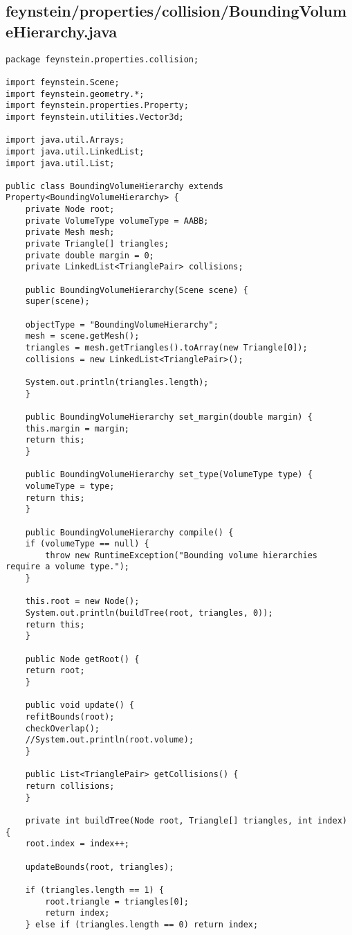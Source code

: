 \subsection*{feynstein/properties/collision/BoundingVolumeHierarchy.java}
\begin{lstlisting}
package feynstein.properties.collision;

import feynstein.Scene;
import feynstein.geometry.*;
import feynstein.properties.Property;
import feynstein.utilities.Vector3d;

import java.util.Arrays;
import java.util.LinkedList;
import java.util.List;

public class BoundingVolumeHierarchy extends Property<BoundingVolumeHierarchy> {
    private Node root;
    private VolumeType volumeType = AABB;
    private Mesh mesh;
    private Triangle[] triangles;
    private double margin = 0;
    private LinkedList<TrianglePair> collisions;

    public BoundingVolumeHierarchy(Scene scene) {
	super(scene);

	objectType = "BoundingVolumeHierarchy";
	mesh = scene.getMesh();
	triangles = mesh.getTriangles().toArray(new Triangle[0]);
	collisions = new LinkedList<TrianglePair>();

	System.out.println(triangles.length);
    }

    public BoundingVolumeHierarchy set_margin(double margin) {
	this.margin = margin;
	return this;
    }

    public BoundingVolumeHierarchy set_type(VolumeType type) {
	volumeType = type;
	return this;
    }

    public BoundingVolumeHierarchy compile() {
	if (volumeType == null) {
	    throw new RuntimeException("Bounding volume hierarchies require a volume type.");
	}

	this.root = new Node();
	System.out.println(buildTree(root, triangles, 0));
	return this;
    }

    public Node getRoot() {
	return root;
    }

    public void update() {
	refitBounds(root);
	checkOverlap();
	//System.out.println(root.volume);
    }

    public List<TrianglePair> getCollisions() {
	return collisions;
    }

    private int buildTree(Node root, Triangle[] triangles, int index) {
	root.index = index++;
	
	updateBounds(root, triangles);

	if (triangles.length == 1) {
	    root.triangle = triangles[0];
	    return index;
	} else if (triangles.length == 0) return index;


\end{lstlisting}
